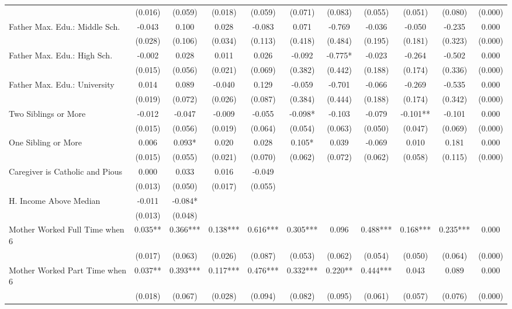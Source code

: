 \begin{tabular}{lcccccccccc}
 & (0.016) & (0.059) & (0.018) & (0.059) & (0.071) & (0.083) & (0.055) & (0.051) & (0.080) & (0.000) \\
Father Max. Edu.: Middle Sch. & -0.043 & 0.100 & 0.028 & -0.083 & 0.071 & -0.769 & -0.036 & -0.050 & -0.235 & 0.000 \\
 & (0.028) & (0.106) & (0.034) & (0.113) & (0.418) & (0.484) & (0.195) & (0.181) & (0.323) & (0.000) \\
Father Max. Edu.: High Sch. & -0.002 & 0.028 & 0.011 & 0.026 & -0.092 & -0.775* & -0.023 & -0.264 & -0.502 & 0.000 \\
 & (0.015) & (0.056) & (0.021) & (0.069) & (0.382) & (0.442) & (0.188) & (0.174) & (0.336) & (0.000) \\
Father Max. Edu.: University & 0.014 & 0.089 & -0.040 & 0.129 & -0.059 & -0.701 & -0.066 & -0.269 & -0.535 & 0.000 \\
 & (0.019) & (0.072) & (0.026) & (0.087) & (0.384) & (0.444) & (0.188) & (0.174) & (0.342) & (0.000) \\
Two Siblings or More & -0.012 & -0.047 & -0.009 & -0.055 & -0.098* & -0.103 & -0.079 & -0.101** & -0.101 & 0.000 \\
 & (0.015) & (0.056) & (0.019) & (0.064) & (0.054) & (0.063) & (0.050) & (0.047) & (0.069) & (0.000) \\
One Sibling or More & 0.006 & 0.093* & 0.020 & 0.028 & 0.105* & 0.039 & -0.069 & 0.010 & 0.181 & 0.000 \\
 & (0.015) & (0.055) & (0.021) & (0.070) & (0.062) & (0.072) & (0.062) & (0.058) & (0.115) & (0.000) \\
Caregiver is Catholic and Pious & 0.000 & 0.033 & 0.016 & -0.049 &  &  &  &  &  &  \\
 & (0.013) & (0.050) & (0.017) & (0.055) &  &  &  &  &  &  \\
H. Income Above Median & -0.011 & -0.084* &  &  &  &  &  &  &  &  \\
 & (0.013) & (0.048) &  &  &  &  &  &  &  &  \\
Mother Worked Full Time when 6 & 0.035** & 0.366*** & 0.138*** & 0.616*** & 0.305*** & 0.096 & 0.488*** & 0.168*** & 0.235*** & 0.000 \\
 & (0.017) & (0.063) & (0.026) & (0.087) & (0.053) & (0.062) & (0.054) & (0.050) & (0.064) & (0.000) \\
Mother Worked Part Time when 6 & 0.037** & 0.393*** & 0.117*** & 0.476*** & 0.332*** & 0.220** & 0.444*** & 0.043 & 0.089 & 0.000 \\
 & (0.018) & (0.067) & (0.028) & (0.094) & (0.082) & (0.095) & (0.061) & (0.057) & (0.076) & (0.000) \\

\end{tabular}
